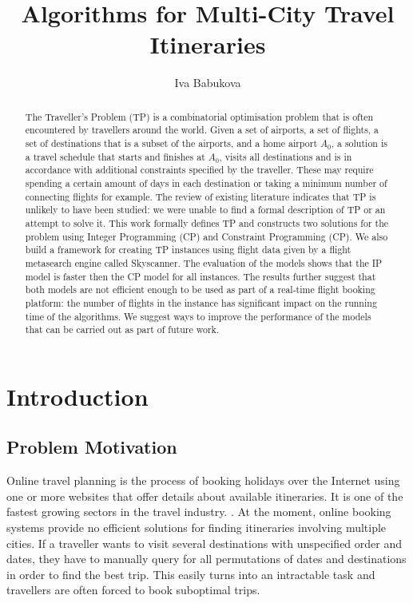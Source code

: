 \documentclass{mpaper}
\begin{document}
\title{Algorithms for Multi-City Travel Itineraries}
\author{Iva Babukova}

\maketitle

\begin{abstract}

The Traveller's Problem (TP) is a combinatorial optimisation problem that is often encountered by travellers around the world. Given a set of airports, a set of flights, a set of destinations that is a subset of the airports, and a home airport $A_{0}$, a solution is a travel schedule that starts and finishes at $A_{0}$, visits all destinations and is in accordance with additional constraints specified by the traveller. These may require spending a certain amount of days in each destination or taking a minimum number of connecting flights for example.
The review of existing literature indicates that TP is unlikely to have been studied: we were unable to find a formal description of TP or an attempt to solve it. This work formally defines TP and constructs two solutions for the problem using Integer Programming (CP) and Constraint Programming (CP). We also build a framework for creating TP instances using flight data given by a flight metasearch engine called Skyscanner. The evaluation of the models shows that the IP model is faster then the CP model for all instances. The results further suggest that both models are not efficient enough to be used as part of a real-time flight booking platform: the number of flights in the instance has significant impact on the running time of the algorithms. We suggest ways to improve the performance of the models that can be carried out as part of future work.
\end{abstract}

\section{Introduction}
\label{intro}
\subsection{Problem Motivation}
Online travel planning is the process of booking holidays over the Internet using one or more websites that offer details about available itineraries. It is one of the fastest growing sectors in the travel industry. \cite{onlinetransportbooking}. At the moment, online booking systems provide no efficient solutions for finding itineraries involving multiple cities. If a traveller wants to visit several destinations with unspecified order and dates, they have to manually query for all permutations of dates and destinations in order to find the best trip. This easily turns into an intractable task and travellers are often forced to book suboptimal trips.
\end{document}
